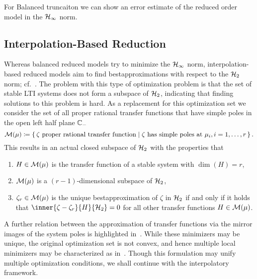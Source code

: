 For Balanced truncaiton we can show an error estimate of the reduced order model in the $\mathcal{H}_\infty$ norm.


\subsection{Interpolation-Based Reduction}\label{subsec:interpolation-reduction}

Whereas balanced reduced models try to minimize the $\mathcal{H}_\infty$ norm, interpolation-based reduced models aim to find bestapproximations with respect to the $\mathcal{H}_2$ norm; cf.~\cite[Section~3]{Gugercin2008}.
The problem with this type of optimization problem is that the set of stable LTI systems does not form a subspace of $\mathcal{H}_2$, indicating that finding solutions to this problem is hard.
As a replacement for this optimization set we consider the set of all proper rational transfer functions that have simple poles in the open left half plane $\mathbb{C}_{-}$
\begin{equation*}
    \mathcal{M}(\mu) \coloneqq \left\{\,\zeta \text{ proper rational transfer function}\mid\zeta \text{ has simple poles at } \mu_i, i = 1, \dots, r\,\right\}.
\end{equation*}
This results in an actual closed subspace of $\mathcal{H}_2$ with the properties that
\begin{enumerate}
    \item $H \in \mathcal{M}(\mu)$ is the transfer function of a stable system with $\dim{(H)} = r$,
    \item $\mathcal{M}(\mu)$ is a $(r - 1)$-dimensional subspace of $\mathcal{H}_2$,
    \item $\zeta_r \in \mathcal{M}(\mu)$ is the unique bestapproximation of $\zeta$ in $\mathcal{H}_2$ if and only if it holds that $\inner{\zeta - \zeta_r}{H}{\mcl{H}_2} = 0$ for all other transfer functions $H \in \mathcal{M}(\mu)$.
\end{enumerate}
A further relation between the approximation of transfer functions via the mirror images of the system poles is highlighted in~\cite[Section~3.1]{Gugercin2008}.
While these minimizers may be unique, the original optimization set is not convex, and hence multiple local minimizers may be characterized as in~\cite[Theorem~3.2]{Gugercin2008}.
Though this formulation may unify multiple optimization conditions, we shall continue with the interpolatory framework.


